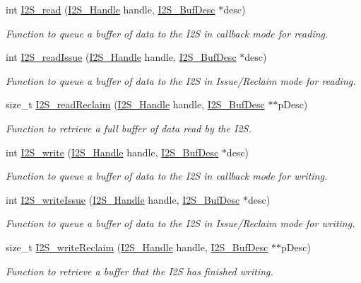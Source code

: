 \begin{DoxyCompactItemize}
int \hyperlink{_i2_s_8h_ae909acec82e9fcd05f3b6ee98312e286}{I2\+S\+\_\+read} (\hyperlink{_i2_s_8h_aff0fad1efd0d9dc3c8d2cc87e73cd5a0}{I2\+S\+\_\+\+Handle} handle, \hyperlink{struct_i2_s___buf_desc}{I2\+S\+\_\+\+Buf\+Desc} $\ast$desc)
\begin{DoxyCompactList}\small\item\em Function to queue a buffer of data to the I2\+S in callback mode for reading. \end{DoxyCompactList}\item 
int \hyperlink{_i2_s_8h_a7e2985cc874172922713b781775b6d01}{I2\+S\+\_\+read\+Issue} (\hyperlink{_i2_s_8h_aff0fad1efd0d9dc3c8d2cc87e73cd5a0}{I2\+S\+\_\+\+Handle} handle, \hyperlink{struct_i2_s___buf_desc}{I2\+S\+\_\+\+Buf\+Desc} $\ast$desc)
\begin{DoxyCompactList}\small\item\em Function to queue a buffer of data to the I2\+S in Issue/\+Reclaim mode for reading. \end{DoxyCompactList}\item 
size\+\_\+t \hyperlink{_i2_s_8h_a5678bf72e1d1954179d2a0db5c45eca8}{I2\+S\+\_\+read\+Reclaim} (\hyperlink{_i2_s_8h_aff0fad1efd0d9dc3c8d2cc87e73cd5a0}{I2\+S\+\_\+\+Handle} handle, \hyperlink{struct_i2_s___buf_desc}{I2\+S\+\_\+\+Buf\+Desc} $\ast$$\ast$p\+Desc)
\begin{DoxyCompactList}\small\item\em Function to retrieve a full buffer of data read by the I2\+S. \end{DoxyCompactList}\item 
int \hyperlink{_i2_s_8h_a4998241e01565a840d592129287df9d6}{I2\+S\+\_\+write} (\hyperlink{_i2_s_8h_aff0fad1efd0d9dc3c8d2cc87e73cd5a0}{I2\+S\+\_\+\+Handle} handle, \hyperlink{struct_i2_s___buf_desc}{I2\+S\+\_\+\+Buf\+Desc} $\ast$desc)
\begin{DoxyCompactList}\small\item\em Function to queue a buffer of data to the I2\+S in callback mode for writing. \end{DoxyCompactList}\item 
int \hyperlink{_i2_s_8h_aa87d62fe24fe0344c23e99e165c15424}{I2\+S\+\_\+write\+Issue} (\hyperlink{_i2_s_8h_aff0fad1efd0d9dc3c8d2cc87e73cd5a0}{I2\+S\+\_\+\+Handle} handle, \hyperlink{struct_i2_s___buf_desc}{I2\+S\+\_\+\+Buf\+Desc} $\ast$desc)
\begin{DoxyCompactList}\small\item\em Function to queue a buffer of data to the I2\+S in Issue/\+Reclaim mode for writing. \end{DoxyCompactList}\item 
size\+\_\+t \hyperlink{_i2_s_8h_aa04de09198983b7bc17a000fc003ab1a}{I2\+S\+\_\+write\+Reclaim} (\hyperlink{_i2_s_8h_aff0fad1efd0d9dc3c8d2cc87e73cd5a0}{I2\+S\+\_\+\+Handle} handle, \hyperlink{struct_i2_s___buf_desc}{I2\+S\+\_\+\+Buf\+Desc} $\ast$$\ast$p\+Desc)
\begin{DoxyCompactList}\small\item\em Function to retrieve a buffer that the I2\+S has finished writing. \end{DoxyCompactList}\end{DoxyCompactItemize}


